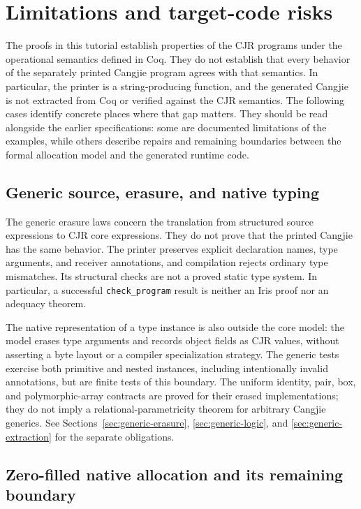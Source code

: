 \documentclass[11pt]{article}
\begin{document}
\appendix
\section{Limitations and target-code risks}
\label{sec:limitations}

The proofs in this tutorial establish properties of the CJR programs under
the operational semantics defined in Coq.  They do not establish that every
behavior of the separately printed Cangjie program agrees with that
semantics.  In particular, the printer is a string-producing function, and
the generated Cangjie is not extracted from Coq or verified against the CJR
semantics.  The following cases identify concrete places where that gap
matters.  They should be read alongside the earlier specifications: some are
documented limitations of the examples, while others describe repairs and remaining boundaries between
the formal allocation model and the generated runtime code.

\subsection{Generic source, erasure, and native typing}
\label{sec:generic-boundary}

The generic erasure laws concern the translation from structured source
expressions to CJR core expressions. They do not prove that the printed
Cangjie has the same behavior. The printer preserves explicit declaration
names, type arguments, and receiver annotations, and compilation rejects
ordinary type mismatches. Its structural checks are not a proved static
type system. In particular, a successful \texttt{check\_program} result
is neither an Iris proof nor an adequacy theorem.

The native representation of a type instance is also outside the core
model: the model erases type arguments and records object fields as CJR
values, without asserting a byte layout or a compiler specialization
strategy. The generic tests exercise both primitive and nested instances,
including intentionally invalid annotations, but are finite tests of this
boundary. The uniform identity, pair, box, and polymorphic-array contracts are proved for
their erased implementations; they do not imply a relational-parametricity
theorem for arbitrary Cangjie generics. See
Sections~\ref{sec:generic-erasure}, \ref{sec:generic-logic}, and
\ref{sec:generic-extraction} for the separate obligations.

\subsection{Zero-filled native allocation and its remaining boundary}
\label{sec:uninitialized-allocation}
\end{document}

